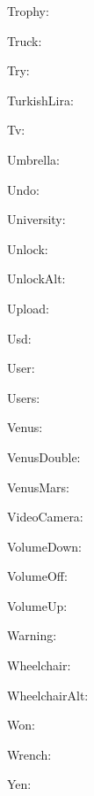 \documentclass{article}
\begin{document}
      Trophy: \faTrophy\ 

      Truck: \faTruck\ 

      Try: \faTry\ 

      TurkishLira: \faTurkishLira\ 

      Tv: \faTv\ 

      Umbrella: \faUmbrella\ 

      Undo: \faUndo\ 

      University: \faUniversity\ 

      Unlock: \faUnlock\ 

      UnlockAlt: \faUnlockAlt\ 

      Upload: \faUpload\ 

      Usd: \faUsd\ 

      User: \faUser\ 

      Users: \faUsers\ 

      Venus: \faVenus\ 

      VenusDouble: \faVenusDouble\ 

      VenusMars: \faVenusMars\ 

      VideoCamera: \faVideoCamera\ 

      VolumeDown: \faVolumeDown\ 

      VolumeOff: \faVolumeOff\ 

      VolumeUp: \faVolumeUp\ 

      Warning: \faWarning\ 

      Wheelchair: \faWheelchair\ 

      WheelchairAlt: \faWheelchairAlt\ 

      Won: \faWon\ 

      Wrench: \faWrench\ 

      Yen: \faYen\ 
\end{document}
